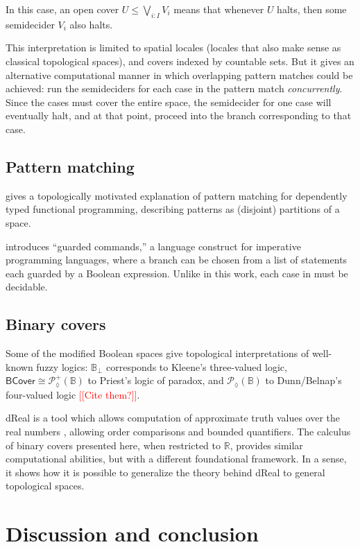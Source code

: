\documentclass[conference]{IEEEtran}
\newcommand{\PLower}{\mathcal{P}_\lozenge}
\newcommand{\R}{\mathbb{R}}
\newcommand{\bool}{\mathbb{B}}
\newcommand{\note}[1]{\textcolor{red}{[[{#1}]]}}
\newcommand{\BCover}{\mathsf{BCover}}
\begin{document}
In this case, an open cover $U \le \bigvee_{i : I} V_i$ means that whenever $U$ halts, then some semidecider $V_i$ also halts.

This interpretation is limited to spatial locales (locales that also make sense as classical topological spaces), and covers indexed by countable sets. But it gives an alternative computational manner in which overlapping pattern matches could be achieved: run the semideciders for each case in the pattern match \emph{concurrently}. Since the cases must cover the entire space, the semidecider for one case will eventually halt, and at that point, proceed into the branch corresponding to that case.

\subsection{Pattern matching}

\cite{coquand1992} gives a topologically motivated explanation of pattern matching for dependently typed functional programming, describing patterns as (disjoint) partitions of a space.

\cite{dijkstra} introduces ``guarded commands,'' a language construct for imperative programming languages, where a branch can be chosen from a list of statements each guarded by a Boolean expression. Unlike in this work, each case in \cite{dijkstra} must be decidable.

\subsection{Binary covers}

Some of the modified Boolean spaces give topological interpretations of well-known fuzzy logics: $\bool_\bot$ corresponds to Kleene's three-valued logic, $\BCover \cong \PLower^+(\bool)$ to Priest's logic of paradox, and $\PLower(\bool)$ to Dunn/Belnap's four-valued logic \note{Cite them?}.

dReal is a tool which allows computation of approximate truth values over the real numbers \cite{dReal}, allowing order comparisons and bounded quantifiers. The calculus of binary covers presented here, when restricted to $\R$, provides similar computational abilities, but with a different foundational framework. In a sense, it shows how it is possible to generalize the theory behind dReal to general topological spaces.

\section{Discussion and conclusion}
\end{document}
